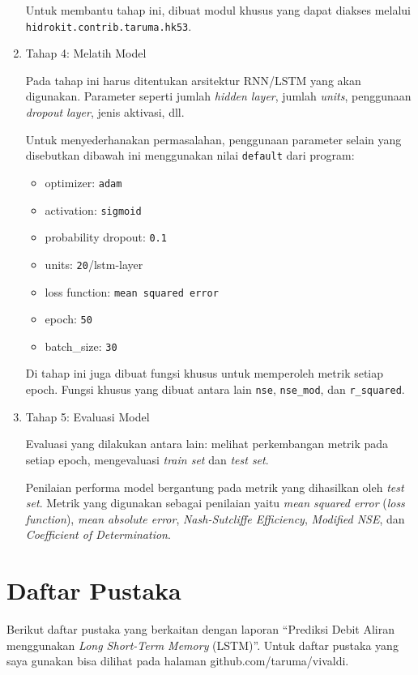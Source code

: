 \documentclass[11pt]{article}
\providecommand{\tightlist}{%
      \setlength{\itemsep}{0pt}\setlength{\parskip}{0pt}}
\begin{document}
\begin{enumerate}
  Untuk membantu tahap ini, dibuat modul khusus yang dapat diakses
  melalui \texttt{hidrokit.contrib.taruma.hk53}.
\item
  Tahap 4: Melatih Model

  Pada tahap ini harus ditentukan arsitektur RNN/LSTM yang akan
  digunakan. Parameter seperti jumlah \emph{hidden layer}, jumlah
  \emph{units}, penggunaan \emph{dropout layer}, jenis aktivasi, dll.

  Untuk menyederhanakan permasalahan, penggunaan parameter selain yang
  disebutkan dibawah ini menggunakan nilai \texttt{default} dari
  program:

  \begin{itemize}
  \tightlist
  \item
    optimizer: \texttt{adam}
  \item
    activation: \texttt{sigmoid}
  \item
    probability dropout: \texttt{0.1}
  \item
    units: \texttt{20}/lstm-layer
  \item
    loss function: \texttt{mean\ squared\ error}
  \item
    epoch: \texttt{50}
  \item
    batch\_size: \texttt{30}
  \end{itemize}

  Di tahap ini juga dibuat fungsi khusus untuk memperoleh metrik setiap
  epoch. Fungsi khusus yang dibuat antara lain \texttt{nse},
  \texttt{nse\_mod}, dan \texttt{r\_squared}.
\item
  Tahap 5: Evaluasi Model

  Evaluasi yang dilakukan antara lain: melihat perkembangan metrik pada
  setiap epoch, mengevaluasi \emph{train set} dan \emph{test set}.

  Penilaian performa model bergantung pada metrik yang dihasilkan oleh
  \emph{test set}. Metrik yang digunakan sebagai penilaian yaitu
  \emph{mean squared error} (\emph{loss function}), \emph{mean absolute
  error}, \emph{Nash-Sutcliffe Efficiency}, \emph{Modified NSE}, dan
  \emph{Coefficient of Determination}.
\end{enumerate}

    \hypertarget{daftar-pustaka}{%
\section{Daftar Pustaka}\label{daftar-pustaka}}

Berikut daftar pustaka yang berkaitan dengan laporan ``Prediksi Debit
Aliran menggunakan \emph{Long Short-Term Memory} (LSTM)''. Untuk daftar
pustaka yang saya gunakan bisa dilihat pada halaman
github.com/taruma/vivaldi.
\end{document}
